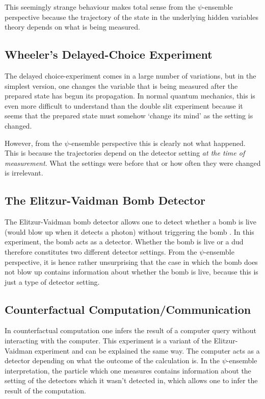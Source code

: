 \documentclass[superscriptaddress,floatfix,nofootinbib,12pt]{revtex4-2}
\begin{document}
This seemingly strange behaviour makes total sense from the $\psi$-ensemble perspective because the trajectory of the state in the underlying hidden variables theory depends on what is being measured. 

\subsection{Wheeler's Delayed-Choice Experiment}

The delayed choice-experiment \cite{Wheeler1978Delayed} comes in a large number of variations, but in the simplest version, one changes the variable that is being measured after the prepared state has begun its propagation. In normal quantum mechanics, this is even more difficult to understand than the double slit experiment because it seems that the prepared state must somehow `change its mind' as the setting is changed. 

However, from the $\psi$-ensemble perspective this is clearly not what happened. This is because the trajectories depend on the detector setting \emph{at the time of measurement}. What the settings were before that or how often they were changed is irrelevant.

\subsection{The Elitzur-Vaidman Bomb Detector}

The Elitzur-Vaidman bomb detector allows one to detect whether a bomb is live (would blow up when it detects a photon) without triggering the bomb \cite{Elitzur1993Bomb}. In this experiment, the bomb acts as a detector. Whether the bomb is live or a dud therefore constitutes two different detector settings. From the $\psi$-ensemble perspective, it is hence rather unsurprising that the case in which the bomb does not blow up contains information about whether the bomb is live, because this is just a type of detector setting.

\subsection{Counterfactual Computation/Communication}

In counterfactual computation \cite{Hosten2006CFComp} one infers the result of a computer query without interacting with the computer. This experiment is a variant of the Elitzur-Vaidman experiment and can be explained the same way. The computer acts as a detector depending on what the outcome of the calculation is. In the $\psi$-ensemble interpretation, the particle which one measures contains information about the setting of the detectors which it wasn't detected in, which allows one to infer the result of the computation.
\end{document}
